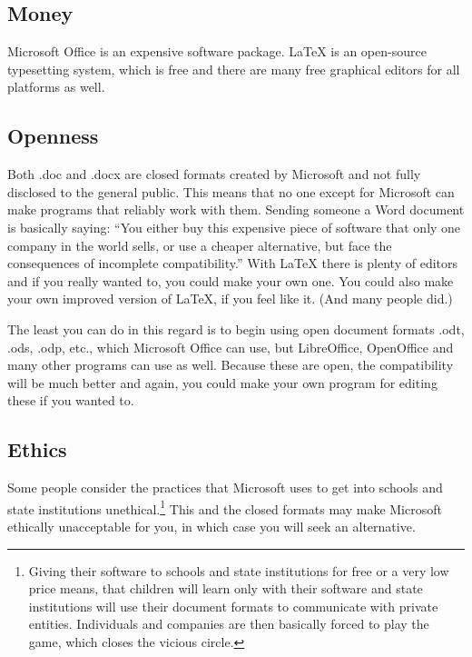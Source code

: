 \documentclass[11pt]{article}
\begin{document}
\subsection{Money}
Microsoft Office is an expensive software package. LaTeX is an open-source typesetting system, which is free and there are many free graphical editors for all platforms as well.
\subsection{Openness}
Both .doc and .docx are closed formats created by Microsoft and not fully disclosed to the general public. This means that no one except for Microsoft can make programs that reliably work with them. Sending someone a Word document is basically saying: ``You either buy this expensive piece of software that only one company in the world sells, or use a cheaper alternative, but face the consequences of incomplete compatibility.'' With LaTeX there is plenty of editors and if you really wanted to, you could make your own one. You could also make your own improved version of LaTeX, if you feel like it. (And many people did.)

The least you can do in this regard is to begin using open document formats .odt, .ods, .odp, etc., which Microsoft Office can use, but LibreOffice, OpenOffice and many other programs can use as well. Because these are open, the compatibility will be much better and again, you could make your own program for editing these if you wanted to.
\pagebreak
\subsection{Ethics}
Some people consider the practices that Microsoft uses to get into schools and state institutions unethical.\footnote{Giving their software to schools and state institutions for free or a very low price means, that children will learn only with their software and state institutions will use their document formats to communicate with private entities. Individuals and companies are then basically forced to play the game, which closes the vicious circle.} This and the closed formats may make Microsoft ethically unacceptable for you, in which case you will seek an alternative.
\end{document}
